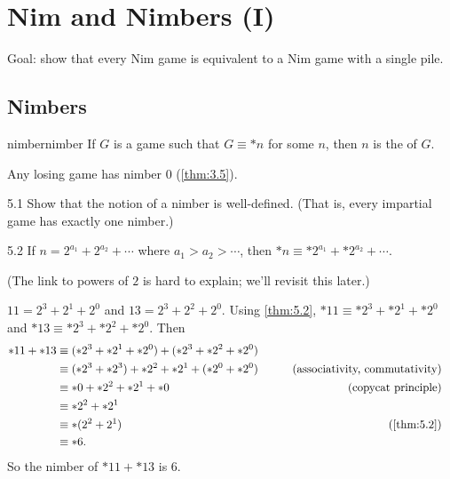 \documentclass[12pt,letterpaper]{report}
\begin{document}
\section{Nim and Nimbers (I)}

Goal: show that every Nim game is equivalent to a Nim game with a single pile.

\subsection{Nimbers}

\begin{defn}{nimber}{nimber}
  If $G$ is a game such that $G \equiv *n$ for some $n$, then $n$ is the  of $G$.
\end{defn}

\begin{ex}
  Any losing game has nimber $0$ (\cref{thm:3.5}).
\end{ex}

\begin{exer}{}{5.1}
  Show that the notion of a nimber is well-defined.
  (That is, every impartial game has exactly one nimber.)
\end{exer}

\begin{exerproof}

\end{exerproof}

\begin{thm}{}{5.2}
  If $n = 2^{a_1} + 2^{a_2} + \cdots$ where $a_1 > a_2 > \cdots$, then
  $*n \equiv *2^{a_1} + *2^{a_2} + \cdots$.
\end{thm}

(The link to powers of $2$ is hard to explain; we'll revisit this later.)

\begin{ex}
  $11 = 2^3 + 2^1 + 2^0$ and $13 = 2^3 + 2^2 + 2^0$.
  Using \cref{thm:5.2}, $*11 \equiv *2^3 + *2^1 + *2^0$ and $*13 \equiv *2^3 + *2^2 + *2^0$.
  Then
  \begin{alignat*}{3}
    *11 + *13
    &\equiv (*2^3 + *2^1 + *2^0) + (*2^3 + *2^2 + *2^0) && \\
    &\equiv (*2^3 + *2^3) + *2^2 + *2^1 + (*2^0 + *2^0)
      \qquad & \text{(associativity, commutativity)} & \\
    &\equiv *0 + *2^2 + *2^1 + *0 & \text{(copycat principle)} && \\
    &\equiv *2^2 + *2^1 && \\
    &\equiv *(2^2 + 2^1) & \text{(\cref{thm:5.2})} &&\\
    &\equiv *6. &&
  \end{alignat*}
  So the nimber of $*11 + *13$ is $6$.
\end{ex}
\end{document}
